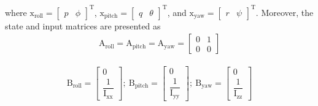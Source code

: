 \documentclass[conference]{IEEEtran}
\begin{document}
where $\boldsymbol{\mathrm{x}}_{\text{roll}} = \begin{bmatrix}
	p & \phi
\end{bmatrix}^\mathrm{T}$, $\boldsymbol{\mathrm{x}}_{\text{pitch}} = \begin{bmatrix}
	q & \theta \end{bmatrix}^\mathrm{T}$, and $\boldsymbol{\mathrm{x}}_{\text{yaw}} = \begin{bmatrix}
	r & \psi
\end{bmatrix}^\mathrm{T}$.
Moreover, the state and input matrices are presented as
\begin{equation}
	\begin{split}
		\boldsymbol{\mathrm{A}}_{\text{roll}}  =\boldsymbol{\mathrm{A}}_{\text{pitch}}  = \boldsymbol{\mathrm{A}}_{\text{yaw}}  = \begin{bmatrix}
			0 & 1\\
			0 & 0
		\end{bmatrix}
	\end{split}
\end{equation}

\begin{equation}
	\begin{split}
		\boldsymbol{\mathrm{B}}_{\text{roll}}  = \begin{bmatrix}
			0
			\\[1em]
			\dfrac{1}{\mathrm{I}_{\text{xx}}}
		\end{bmatrix};~ \boldsymbol{\mathrm{B}}_{\text{pitch}}  = \begin{bmatrix}
			0
			\\[1em]
			\dfrac{1}{\mathrm{I}_{\text{yy}}}
		\end{bmatrix};~ \boldsymbol{\mathrm{B}}_{\text{yaw}}  = \begin{bmatrix}
			0
			\\[1em]
			\dfrac{1}{\mathrm{I}_{\text{zz}}}
		\end{bmatrix}
	\end{split}
\end{equation}
\end{document}
